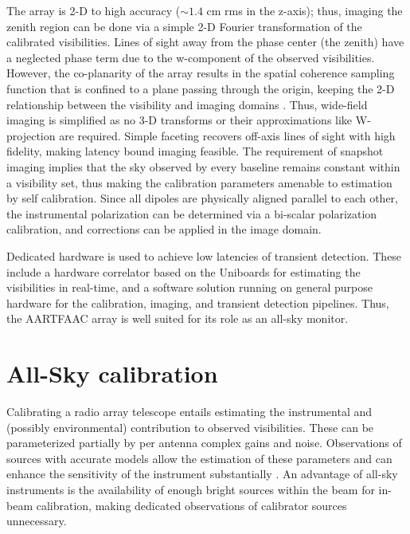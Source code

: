 \documentclass{aa}
\begin{document}
The  array is  2-D to  high accuracy  ($\sim$$1.4$ cm  rms in  the  z-axis); thus,
imaging  the  zenith  region  can  be  done  via  a  simple  \mbox{2-D}  Fourier
transformation of  the calibrated  visibilities.  Lines of  sight away  from the
phase center (the zenith) have a  neglected phase term due to the w-component of
the observed  visibilities.  However, the  co-planarity of the array  results in
the  spatial coherence sampling  function that  is confined  to a  plane passing
through  the origin,  keeping the  2-D relationship  between the  visibility and
imaging   domains  \citep{cornwell1992radio}.    Thus,  wide-field   imaging  is
simplified  as  no 3-D  transforms  or  their  approximations like  W-projection
\citep{cornwell2008noncoplanar} are required.  Simple faceting recovers off-axis
lines of  sight with high fidelity,  making latency bound  imaging feasible. The
requirement of snapshot imaging implies  that the sky observed by every baseline
remains constant within a visibility set, thus making the calibration parameters
amenable to  estimation by self  calibration.  Since all dipoles  are physically
aligned parallel to each other,  the instrumental polarization can be determined
via a bi-scalar polarization calibration,  and corrections can be applied in the
image domain.

Dedicated  hardware is  used to  achieve low  latencies of  transient detection.
These include  a hardware correlator based  on the Uniboards  for estimating the
visibilities in  real-time, and a  software solution running on  general purpose
hardware for  the calibration, imaging, and transient  detection pipelines. Thus,
the AARTFAAC array is well suited for its role as an all-sky monitor.

\section{\label{sec:Array-calibration-for}All-Sky calibration}
Calibrating  a radio  array telescope  entails estimating  the  instrumental and
(possibly environmental)  contribution to  observed visibilities.  These  can be
parameterized partially by per antenna  complex gains and noise. Observations of
sources with accurate  models allow the estimation of  these parameters and can
enhance     the     sensitivity      of     the     instrument     substantially
\citep{taylor1999synthesis}.   An  advantage   of  all-sky  instruments  is  the
availability of enough  bright sources within the beam  for in-beam calibration,
making dedicated observations of calibrator sources unnecessary.
\end{document}
